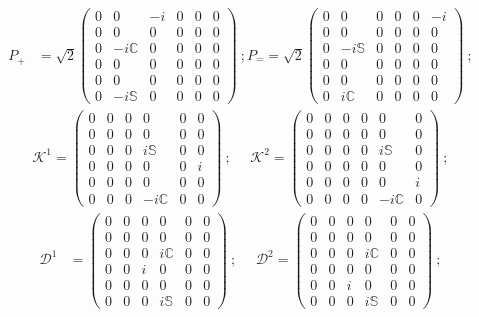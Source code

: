 \documentclass[%
 reprint,
superscriptaddress,
 amsmath,amssymb,
 aps,
]{revtex4-2}
\begin{document}
    \begin{align}
     P_{\hat{+}}&=\sqrt{2}\begin{pmatrix}
        0&0&-i&0&0&0\\
        0&0&0&0&0&0\\
        0&-i\mathbb{C}&0&0&0&0\\
        0&0&0&0&0&0\\
        0&0&0&0&0&0\\
        0&-i\mathbb{S}&0&0&0&0
    \end{pmatrix}~;P_{\hat{-}}=\sqrt{2}\begin{pmatrix}
        0&0&0&0&0&-i\\
        0&0&0&0&0&0\\
        0&-i\mathbb{S}&0&0&0&0\\
        0&0&0&0&0&0\\
        0&0&0&0&0&0\\
        0&i\mathbb{C}&0&0&0&0
    \end{pmatrix}~;\nonumber
    \end{align}
    \begin{align}
        \mathcal{K}^{1}=\begin{pmatrix}
        0&0&0&0&0&0\\
        0&0&0&0&0&0\\
        0&0&0&i\mathbb{S}&0&0\\
        0&0&0&0&0&i\\
        0&0&0&0&0&0\\
        0&0&0&-i\mathbb{C}&0&0
    \end{pmatrix}~;~~~~~~\mathcal{K}^{2}=\begin{pmatrix}
        0&0&0&0&0&0\\
        0&0&0&0&0&0\\
        0&0&0&0&i\mathbb{S}&0\\
        0&0&0&0&0&0\\
        0&0&0&0&0&i\\
        0&0&0&0&-i\mathbb{C}&0
    \end{pmatrix}~;\nonumber
    \end{align}
    \begin{align}
    \mathcal{D}^{1}&=\begin{pmatrix}
        0&0&0&0&0&0\\
        0&0&0&0&0&0\\
        0&0&0&i\mathbb{C}&0&0\\
        0&0&i&0&0&0\\
        0&0&0&0&0&0\\
        0&0&0&i\mathbb{S}&0&0
    \end{pmatrix}~;~~~~~~\mathcal{D}^{2}=\begin{pmatrix}
        0&0&0&0&0&0\\
        0&0&0&0&0&0\\
        0&0&0&i\mathbb{C}&0&0\\
        0&0&0&0&0&0\\
        0&0&i&0&0&0\\
        0&0&0&i\mathbb{S}&0&0
    \end{pmatrix}~;\nonumber
    \end{align}
\end{document}
